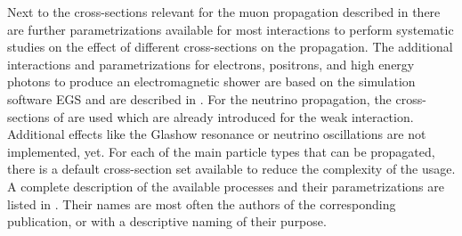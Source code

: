 Next to the cross-sections relevant for the muon propagation described in  there are further parametrizations available for most interactions to perform systematic studies on the effect of different cross-sections on the propagation.
The additional interactions and parametrizations for electrons, positrons, and high energy photons to produce an electromagnetic shower are based on the simulation software EGS \cite{EGS5} and are described in \cite{Alameddine20Master}.
For the neutrino propagation, the cross-sections of \cite{CSMS11NuXsection} are used which are already introduced for the weak interaction.
Additional effects like the Glashow resonance or neutrino oscillations are not implemented, yet.
For each of the main particle types that can be propagated, there is a default cross-section set available to reduce the complexity of the usage.
A complete description of the available processes and their parametrizations are listed in .
Their names are most often the authors of the corresponding publication, or with a descriptive naming of their purpose.
